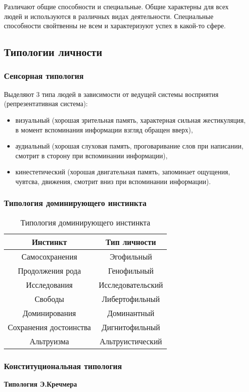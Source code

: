 Различают общие способности и специальные. Общие характерны для всех людей и используются в различных видах деятельности. Специальные способности свойтвенны не всем и характеризуют успех в какой-то сфере.

\subsection{Типологии личности}
\subsubsection{Сенсорная типология}
Выделяют 3 типа людей в зависимости от ведущей системы восприятия (репрезентативная система):
\begin{itemize}
	\item визуальный (хорошая зрительная память, характерная сильная жестикуляция, в момент вспоминания информации взгляд обращен вверх),
	\item аудиальный (хорошая слуховая память, проговаривание слов при написании, смотрит в сторону при вспоминании информации),
	\item кинестетический (хорошая двигательная память, запоминает ощущения, чувтсва, движения, смотрит вниз при вспоминании информации).
\end{itemize}
\subsubsection{Типология доминирующего инстинкта}
\begin{table}
\begin{tabular}{|c|c|}
	Инстинкт & Тип личности\\
	\hline
	Самосохранения & Эгофильный\\
	\hline
	Продолжения рода & Генофильный\\
	\hline
	Исследования & Исследовательский\\
	\hline
	Свободы & Либертофильный\\
	\hline
	Доминирования & Доминантный\\
	\hline
	Сохранения достоинства & Дигнитофильный\\
	\hline
	Альтруизма & Альтруистический\\
	\hline
\end{tabular}
\caption{Типология доминирующего инстинкта}
\end{table}

\subsubsection{Конституциональная типология}
\textbf{Типология Э.Кречмера}\\

